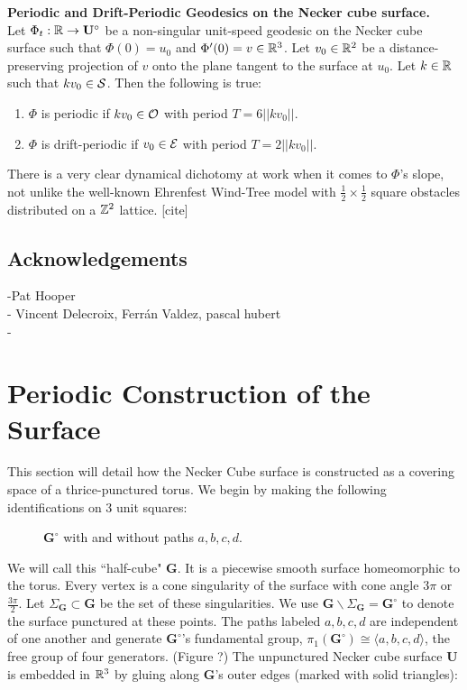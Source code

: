 \documentclass[a4paper, 11pt]{article}
\def\bU{\mathbf{U}} \def\btU{\tilde{\bU}} \def\bUs{\bU^\circ}
\def\bG{\mathbf{G}} \def\bGs{\mathbf{G}^\circ}
\def\<{\langle} \def\>{\rangle}
\begin{document}
\begin{thm*} \textbf{Periodic and Drift-Periodic Geodesics on the Necker cube surface.} 
\\Let $\Phi_t:\RR\rightarrow\bUs$ be a non-singular unit-speed geodesic on the Necker cube surface such that $\Phi(0)=u_0$ and $\Phi'(0)=v\in\mathbb{R}^3$. Let $v_0\in\mathbb{R}^2$ be a distance-preserving projection of $v$ onto the plane tangent to the surface at $u_0$. Let $k\in\mathbb{R}$ such that $kv_0\in\mathcal{S}$. Then the following is true:
\begin{enumerate}[label=(\roman*)]
\item $\Phi$ is periodic if $kv_0\in\mathcal{O}$ with period $T=6||kv_0||$.
\item $\Phi$ is drift-periodic if $v_0\in\mathcal{E}$ with period $T=2||kv_0||$.
\end{enumerate}
\end{thm*}

There is a very clear dynamical dichotomy at work when it comes to $\Phi$'s slope, not unlike the well-known Ehrenfest Wind-Tree model with $\frac{1}{2}\times\frac{1}{2}$ square obstacles distributed on a $\mathbb{Z}^2$ lattice. [cite]

\subsection{Acknowledgements}
-Pat Hooper\\
- Vincent Delecroix, Ferrán Valdez, pascal hubert\\
- \\

\newpage

\section{Periodic Construction of the Surface}
This section will detail how the Necker Cube surface is constructed as a covering space of a thrice-punctured torus. We begin by making the following identifications on 3 unit squares:
\begin{figure}[H]
\centering

\caption{$\bGs$ with and without paths $a,b,c,d$.}
\end{figure}

We will call this ``half-cube" $\bG$. It is a piecewise smooth surface homeomorphic to the torus. Every vertex is a cone singularity of the surface with cone angle $3\pi$ or $\frac{3\pi}{2}$. Let $\Sigma_{\bG}\subset\bG$ be the set of these singularities. We use $\bG\backslash\Sigma_{\bG} = \bGs$ to denote the surface punctured at these points. The paths labeled $a,b,c,d$ are independent of one another and generate $\bGs$'s fundamental group, $\pi_1(\bGs)\cong \<a,b,c,d \>$, the free group of four generators. (Figure ?) The unpunctured Necker cube surface $\bU$ is embedded in $\mathbb{R}^3$ by gluing along $\bG$'s outer edges (marked with solid triangles):
\end{document}
